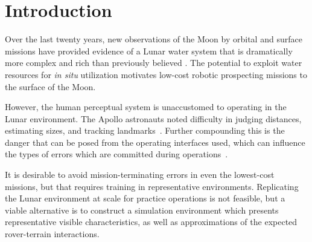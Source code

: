 \documentclass[twocolumn,letterpaper]{IEEEAerospaceCLS}  %
\begin{document}




\section{Introduction}
\label{sec:intro}

Over the last twenty years, new observations of the Moon by orbital and surface missions have provided evidence of a Lunar water system that is dramatically more complex and rich than previously believed \cite{colaprete2017resource}.
The potential to exploit water resources for \emph{in situ} utilization motivates low-cost robotic prospecting missions to the surface of the Moon.

However, the human perceptual system is unaccustomed to operating in the Lunar environment.
The Apollo astronauts noted difficulty in judging distances, estimating sizes, and tracking landmarks~\cite{vaniman1991lunar}.  Further compounding this is the danger that can be posed from the operating interfaces used, which can influence the types of errors which are committed during operations~\cite{mcgovern1988human,kelly2011real}.  

It is desirable to avoid mission-terminating errors in even the lowest-cost missions, but that requires training in representative environments.  
Replicating the Lunar environment at scale for practice operations is not feasible, but a viable alternative is to construct a simulation environment which presents representative visible characteristics, as well as approximations of the expected rover-terrain interactions.
\end{document}
